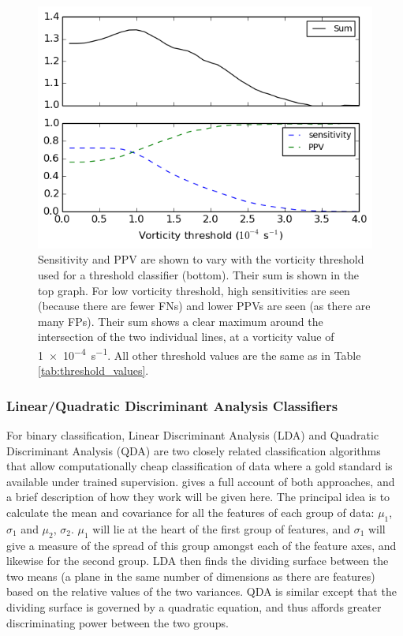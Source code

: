 \documentclass[pdftex,12pt,a4paper]{report}
\begin{document}
\begin{figure}[ht!]
    \centering
    \includegraphics[width=\textwidth]{figures/threshold_sens_ppv_vort}
    \vspace{-10pt}
    \caption{Sensitivity and PPV are shown to vary with the vorticity threshold used for a threshold
        classifier (bottom). Their sum is shown in the top graph. For low vorticity threshold, high
        sensitivities are seen (because there are fewer FNs) and lower PPVs are seen (as there are
        many FPs). Their sum shows a clear maximum around the intersection of the two individual
        lines, at a vorticity value of \SI{1e-4}{s^{-1}}. All other threshold values are the same as
        in Table \ref{tab:threshold_values}. }
    \label{fig:threshold_sens_ppv_vort}
\end{figure}

\subsubsection{Linear/Quadratic Discriminant Analysis Classifiers}

For binary classification, Linear Discriminant Analysis (LDA) and Quadratic Discriminant Analysis
(QDA) are two closely related classification algorithms that allow computationally cheap
classification of data where a gold standard is available under trained supervision.
\textcite{mclachlan2004discriminant} gives a full account of both approaches, and a brief description of how they
work will be given here. The principal idea is to calculate the mean and covariance for all the
features of each group of data: $\mu_1$, $\sigma_1$ and $\mu_2$, $\sigma_2$. $\mu_1$ will lie at the
heart of the first group of features, and $\sigma_1$ will give a measure of the spread of this group
amongst each of the feature axes, and likewise for the second group. LDA then finds the dividing
surface between the two means (a plane in the same number of dimensions as there are features) based
on the relative values of the two variances. QDA is similar except that the dividing surface is
governed by a quadratic equation, and thus affords greater discriminating power between the two
groups.
\end{document}
